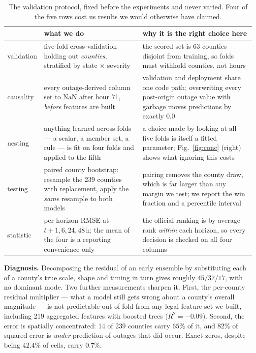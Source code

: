 \documentclass[10pt,letterpaper,twocolumn]{article}
\begin{document}
\begin{table}[b]\footnotesize\centering
\setlength{\tabcolsep}{3.2pt}
\begin{tabular}{@{}L{1.42cm}L{3.10cm}L{3.72cm}@{}}
\toprule
& what we do & why it is the right choice here \\
\midrule
validation & five-fold cross-validation holding out \emph{counties}, stratified
  by state $\times$ severity &
  the scored set is 63 counties disjoint from training, so folds must withhold
  counties, not hours \\[2pt]
causality & every outage-derived column set to NaN after hour 71, \emph{before}
  features are built &
  validation and deployment share one code path; overwriting every post-origin
  outage value with garbage moves predictions by exactly $0.0$ \\[2pt]
nesting & anything learned across folds --- a scalar, a member set, a rule ---
  is fit on four folds and applied to the fifth &
  a choice made by looking at all five folds is itself a fitted
  parameter;
  Fig.~\ref{fig:conc} (right) shows what ignoring this costs \\[2pt]
testing & paired county bootstrap: resample the 239 counties with
  replacement, apply the \emph{same} resample to both models &
  pairing removes the county draw, which is far larger than any margin we
  test; we report the win fraction and a percentile interval \\[2pt]
statistic & per-horizon RMSE at $t{+}1,6,24,48$\,h; the mean of the four is a
  reporting convenience only &
  the official ranking is by average rank \emph{within} each horizon, so every
  decision is checked on all four columns \\
\bottomrule
\end{tabular}
\caption{The validation protocol, fixed before the experiments and never
varied. Four of the five rows cost us results we would otherwise have claimed.}
\label{tab:proto}
\end{table}

\textbf{Diagnosis.} Decomposing the residual of an early ensemble by substituting
each of a county's true scale, shape and timing in turn gives roughly
$45/37/17$, with no dominant mode. Two further measurements sharpen it. First,
the per-county residual multiplier --- what a model still gets wrong about a
county's overall magnitude --- is not predictable out of fold from any legal
feature set we built, including 219 aggregated features with boosted trees
($R^2 = -0.09$). Second, the error is spatially concentrated: 14 of 239 counties
carry $65\%$ of it, and $82\%$ of squared error is \emph{under}-prediction of
outages that did occur. Exact zeros, despite being $42.4\%$ of cells, carry
$0.7\%$.
\end{document}
